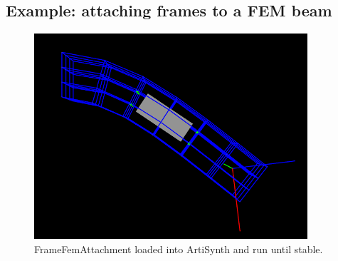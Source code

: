 \subsection{Example: attaching frames to a FEM beam}

\begin{figure}[ht]
	\centering
	\includegraphics[width=\imglength]{images/FrameFemAttachment}
	\caption{FrameFemAttachment loaded into ArtiSynth and run until stable.}
	\label{fig:fem:frameFemAttachment}
\end{figure}

